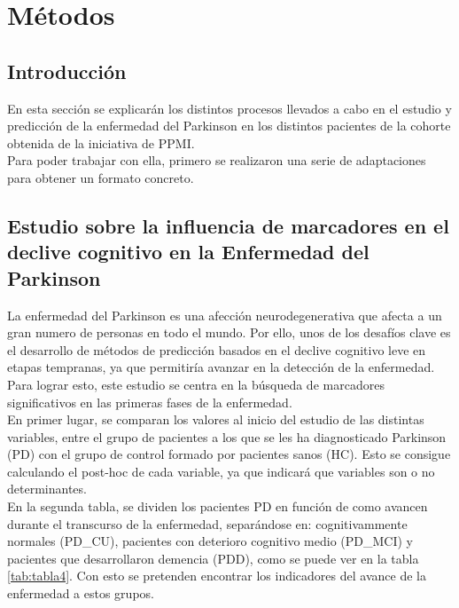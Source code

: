 \chapter{Métodos}

\section{Introducción}
En esta sección se explicarán los distintos procesos llevados a cabo en el estudio y predicción de la enfermedad del Parkinson en los distintos pacientes de la cohorte obtenida de la iniciativa de PPMI.\\

Para poder trabajar con ella, primero se realizaron una serie de adaptaciones para obtener un formato concreto.


\section{Estudio sobre la influencia de marcadores en el declive cognitivo en la Enfermedad del Parkinson}

La enfermedad del Parkinson es una afección neurodegenerativa que afecta a un gran numero de personas en todo el mundo. Por ello, unos de los desafíos clave es el desarrollo de métodos de predicción basados en el declive cognitivo leve en etapas tempranas, ya que permitiría avanzar en la detección de la enfermedad. Para lograr esto, este estudio se centra en la búsqueda de marcadores significativos en las primeras fases de la enfermedad.\\

En primer lugar, se comparan los valores al inicio del estudio de las distintas variables, entre el grupo de pacientes a los que se les ha diagnosticado Parkinson (PD) con el grupo de control formado por pacientes sanos (HC). Esto se consigue calculando el post-hoc de cada variable, ya que indicará que variables son o no determinantes.\\

En la segunda tabla, se dividen los pacientes PD en función de como avancen durante el transcurso de la enfermedad, separándose en: cognitivammente normales (PD\_CU), pacientes con deterioro cognitivo medio (PD\_MCI) y pacientes que desarrollaron demencia (PDD), como se puede ver en la tabla \ref{tab:tabla4}. Con esto se pretenden encontrar los indicadores del avance de la enfermedad a estos grupos.\\


